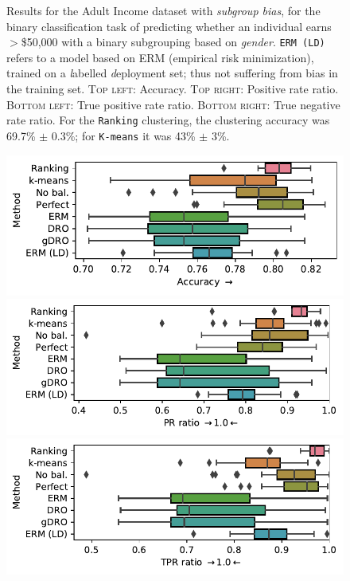 \begin{figure}[p]
    \caption{%
    Results for the Adult Income dataset with \emph{subgroup bias},
    for the binary classification task of predicting whether an individual earns $>$\$50,000 with a binary subgrouping based on \emph{gender}.
    \texttt{ERM (LD)} refers to a model based on ERM (empirical risk minimization),
    trained on a \emph{l}abelled \emph{d}eployment set; thus not suffering from bias in the training set.
    \textsc{Top left}: Accuracy.
    \textsc{Top right}: Positive rate ratio.
    \textsc{Bottom left}: True positive rate ratio.
    \textsc{Bottom right}: True negative rate ratio.
    For the \texttt{Ranking} clustering, the clustering accuracy was 69.7\% $\pm$ 0.3\%;
    for \texttt{K-means} it was 43\% $\pm$ 3\%.
    }%
    \label{fig:adult-subgroup-bias}
\end{figure}
\begin{figure}[p]
    \centering
    \includegraphics[width=\columnwidth]{paper3/figures/adult_miss_s_acc.pdf}
    \includegraphics[width=\columnwidth]{paper3/figures/adult_miss_s_prr.pdf}
    \includegraphics[width=\columnwidth]{paper3/figures/adult_miss_s_tprr.pdf}

\end{figure}
